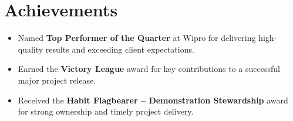 \documentclass[letterpaper,11pt]{article}
\newcommand{\resumeItem}[1]{
  \item\small{
    {#1 \vspace{-2pt}}
  }
}
\begin{document}
\section{Achievements}
\begin{itemize}[leftmargin=0.15in]
    \resumeItem{Named \textbf{Top Performer of the Quarter} at Wipro for delivering high-quality results and exceeding client expectations.}
    \resumeItem{Earned the \textbf{Victory League} award for key contributions to a successful major project release.}
    \resumeItem{Received the \textbf{Habit Flagbearer -- Demonstration Stewardship} award for strong ownership and timely project delivery.}
\end{itemize}
\end{document}

